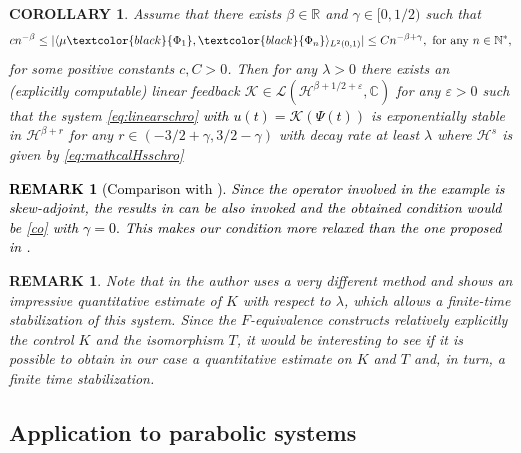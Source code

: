 \documentclass[11pt, dvipsnames]{amsart}
\newtheorem{rmk}[theorem]{REMARK}
\newtheorem{corollary}[theorem]{COROLLARY}
\begin{document}
\begin{corollary}
    Assume that there exists $\beta\in \mathbb{R}$ and $\gamma\in[0,1/2)$ such that
    \begin{equation}
        c n^{-\beta}\leq |\langle \mu\textcolor{black}{\Phi_{1}}, \textcolor{black}{\Phi_{n}}\rangle_{L^{2}(0,1)}|\leq C n^{-\beta+\gamma}, \text{ for any }n\in\mathbb{N}^{*},\label{co}
    \end{equation}
    for some positive constants $c,C>0$. 
    Then for any $\lambda>0$ there exists an (explicitly computable) linear feedback $\mathcal{K}\in \mathcal{L}(\mathcal{H}^{\beta+1/2+\varepsilon},\mathbb{C})$ for any $\varepsilon>0$ such that the system \eqref{eq:linearschro} \textcolor{black}{with $u(t)=\mathcal{K}(\Psi(t))$} is exponentially stable in $\mathcal{H}^{\beta+r}$ for any $r\in(-3/2+\gamma,3/2-\gamma)$ with decay rate at least $\lambda$ where $\mathcal{H}^{s}$ is given by \eqref{eq:mathcalHsschro}
\end{corollary}


\textcolor{black}{
\begin{rmk}[Comparison with \cite{Gagnon2022-fredholm}]
    Since the operator involved in the example is skew-adjoint, the results in \cite{Gagnon2022-fredholm} can be also invoked and the obtained condition would be \eqref{co} with $\gamma=0.$ This makes our condition more relaxed than the one proposed in \cite{Gagnon2022-fredholm}. 
\end{rmk}
}

\begin{rmk}
    Note that in \cite{nguyen2024rapid} the author uses a very different method and shows an impressive quantitative estimate of $K$ with respect to $\lambda$, which allows a finite-time stabilization of this system. Since the $F$-equivalence constructs relatively explicitly the control $K$ and the isomorphism $T$, it would be interesting to see if it is possible to obtain in our case a quantitative estimate on $K$ and $T$ and, in turn, a finite time stabilization.
\end{rmk}



\subsection{Application to parabolic systems}
\label{sec:diffusion}
\end{document}
